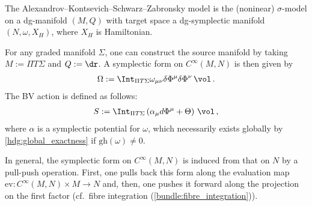    \begin{example}
        The Alexandrov--Kontsevich--Schwarz--Zabronsky model is the (noninear) $\sigma$-model on a dg-manifold $(M,Q)$ with target space a dg-symplectic manifold $(N,\omega,X_H)$, where $X_H$ is Hamiltonian.

        For any graded manifold $\Sigma$, one can construct the source manifold by taking $M:=\Pi T\Sigma$ and $Q:=\dr$. A symplectic form on $C^\infty(M,N)$ is then given by
        \begin{gather}
            \Omega := \Int_{\Pi T\Sigma}\omega_{\mu\nu}\delta\Phi^\mu\delta\Phi^\nu\,\vol\,.
        \end{gather}
        The BV action is defined as follows:
        \begin{gather}
            S := \Int_{\Pi T\Sigma}\left(\alpha_\mu d\Phi^\mu+\Theta\right)\,\vol\,,
        \end{gather}
        where $\alpha$ is a symplectic potential for $\omega$, which necessarily exists globally by \cref{hdg:global_exactness} if $\mathrm{gh}(\omega)\neq0$.

        In general, the symplectic form on $C^\infty(M,N)$ is induced from that on $N$ by a pull-push operation. First, one pulls back this form along the evaluation map $\mathrm{ev}:C^\infty(M,N)\times M\rightarrow N$ and, then, one pushes it forward along the projection on the first factor (cf.~fibre integration (\cref{bundle:fibre_integration})).

    \end{example}